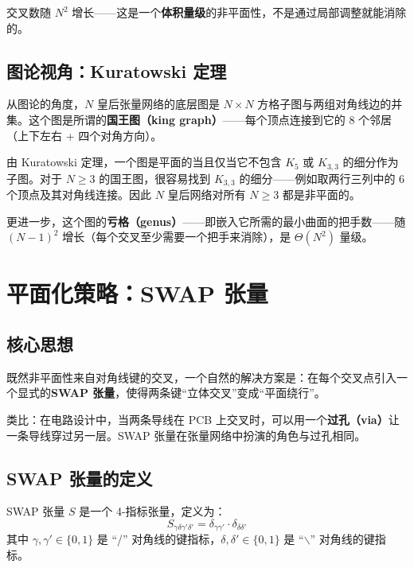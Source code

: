 \documentclass[12pt,a4paper]{ctexart}
\begin{document}
交叉数随 $N^2$ 增长——这是一个\textbf{体积量级}的非平面性，不是通过局部调整就能消除的。

\subsection{图论视角：Kuratowski 定理}

从图论的角度，$N$ 皇后张量网络的底层图是 $N \times N$ 方格子图与两组对角线边的并集。这个图是所谓的\textbf{国王图（king graph）}——每个顶点连接到它的 8 个邻居（上下左右 + 四个对角方向）。

由 Kuratowski 定理，一个图是平面的当且仅当它不包含 $K_5$ 或 $K_{3,3}$ 的细分作为子图。对于 $N \geq 3$ 的国王图，很容易找到 $K_{3,3}$ 的细分——例如取两行三列中的 6 个顶点及其对角线连接。因此 $N$ 皇后网络对所有 $N \geq 3$ 都是非平面的。

更进一步，这个图的\textbf{亏格（genus）}——即嵌入它所需的最小曲面的把手数——随 $(N-1)^2$ 增长（每个交叉至少需要一个把手来消除），是 $\Theta(N^2)$ 量级。


\section{平面化策略：SWAP 张量}

\subsection{核心思想}

既然非平面性来自对角线键的交叉，一个自然的解决方案是：在每个交叉点引入一个显式的\textbf{SWAP 张量}，使得两条键``立体交叉''变成``平面绕行''。

类比：在电路设计中，当两条导线在 PCB 上交叉时，可以用一个\textbf{过孔（via）}让一条导线穿过另一层。SWAP 张量在张量网络中扮演的角色与过孔相同。

\subsection{SWAP 张量的定义}

SWAP 张量 $S$ 是一个 4-指标张量，定义为：
\begin{equation}
\boxed{S_{\gamma \delta \gamma' \delta'} = \delta_{\gamma \gamma'} \cdot \delta_{\delta \delta'}}
\end{equation}
其中 $\gamma, \gamma' \in \{0,1\}$ 是 ``/'' 对角线的键指标，$\delta, \delta' \in \{0,1\}$ 是 ``$\backslash$'' 对角线的键指标。
\end{document}

